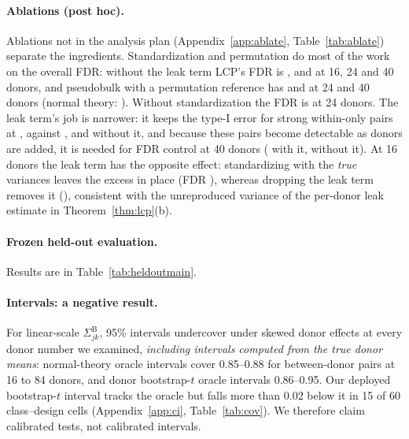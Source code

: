 \documentclass[10pt,letterpaper]{article}
\theoremstyle{definition}
\newcommand{\SB}{\Sigma^{\mathrm{B}}}
\begin{document}
\paragraph{Ablations (post hoc).} Ablations not in the analysis plan (Appendix~\ref{app:ablate}, Table~\ref{tab:ablate}) separate the ingredients. Standardization and permutation do most of the work on the overall FDR: without the leak term LCP's FDR is \ABLCPnoleakFsixteen{}, \ABLCPnoleakFtwentyfour{} and \ABLCPnoleakFforty{} at 16, 24 and 40 donors, and pseudobulk with a permutation reference has \ABPBpermFtwentyfour{} and \ABPBpermFforty{} at 24 and 40 donors (normal theory: \PBFDRrange{}). Without standardization the FDR is \ABLCPunstdFtwentyfour{} at 24 donors. The leak term's job is narrower: it keeps the type-I error for strong within-only pairs at \ABfullSSrange{}, against \ABLCPnoleakSsixteen{}, \ABLCPnoleakStwentyfour{} and \ABLCPnoleakSforty{} without it, and because these pairs become detectable as donors are added, it is needed for FDR control at 40 donors (\ABLCPgpuFforty{} with it, \ABLCPnoleakFforty{} without it). At 16 donors the leak term has the opposite effect: standardizing with the \emph{true} variances leaves the excess in place (FDR \ABLCPtruevFsixteen{}), whereas dropping the leak term removes it (\ABLCPnoleakFsixteen{}), consistent with the unreproduced variance of the per-donor leak estimate in Theorem~\ref{thm:lcp}(b).



\paragraph{Frozen held-out evaluation.} Results are in Table~\ref{tab:heldoutmain}. \HELDOUTsentence


\paragraph{Intervals: a negative result.} For linear-scale $\SB_{jk}$, 95\% intervals undercover under skewed donor effects at every donor number we examined, \emph{including intervals computed from the true donor means}: normal-theory oracle intervals cover 0.85--0.88 for between-donor pairs at 16 to 84 donors, and donor bootstrap-$t$ oracle intervals 0.86--0.95. Our deployed bootstrap-$t$ interval tracks the oracle but falls more than 0.02 below it in 15 of 60 class--design cells (Appendix~\ref{app:ci}, Table~\ref{tab:cov}). We therefore claim calibrated tests, not calibrated intervals.
\end{document}
